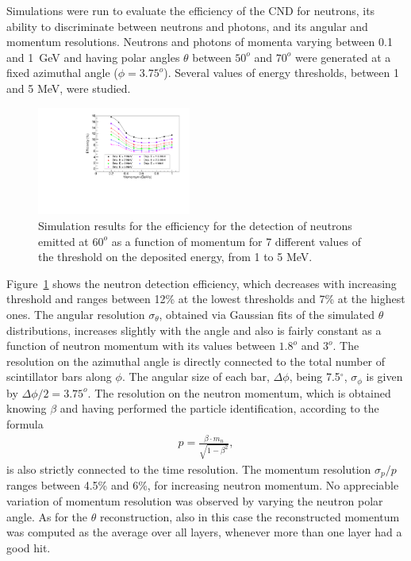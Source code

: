 Simulations were run to evaluate the efficiency of the CND for neutrons, its ability to discriminate between neutrons and photons, and its angular and momentum resolutions. Neutrons and photons of momenta varying between 0.1 and 1~GeV and having polar angles $\theta$ between $50^o$ and $70^o$ were generated at a fixed azimuthal angle ($\phi = 3.75^o$). Several values of energy thresholds, between 1 and 5 MeV, were studied.
\begin{figure}[htb]  
\begin{center}
\includegraphics[width=0.45\textwidth]{Figure/Figure37.pdf}
\caption {Simulation results for the efficiency for the detection of neutrons emitted at $60^o$ as a function of momentum for 7 different values of the threshold on the deposited energy, from 1 to 5 MeV.}
\label{eff_vs_thr_mom}
\end{center}
\end{figure}
Figure~\ref{eff_vs_thr_mom} shows the neutron detection efficiency, which decreases with increasing threshold and ranges between 12\% at the lowest thresholds and 7\% at the highest ones. 
The angular resolution $\sigma_\theta$, obtained via Gaussian fits of the simulated $\theta$ distributions, increases slightly with the angle and also is fairly constant as a function of neutron momentum with its values between $1.8^o$ and $3^o$. 
The resolution on the azimuthal angle is directly connected to the total number of scintillator bars along $\phi$. The angular size of each bar, $\Delta\phi$, being 7.5$^{\circ}$, %
$\sigma_\phi$ is given by $\Delta\phi/2=3.75^o$.
The resolution on the neutron momentum, which is obtained knowing $\beta$ and having performed the particle identification, according to the formula
\begin{eqnarray}
p = \frac{\beta\cdot m_n}{\sqrt{1-\beta^2}},
\end{eqnarray}
is also strictly connected to the time resolution. The momentum resolution $\sigma_p/p$ ranges between 4.5\% and 6\%, for increasing neutron momentum. No appreciable variation of momentum resolution was observed by varying the neutron polar angle. As for the $\theta$ reconstruction, also in this case the reconstructed momentum was computed as the average over all layers, whenever more than one layer had a good hit.

